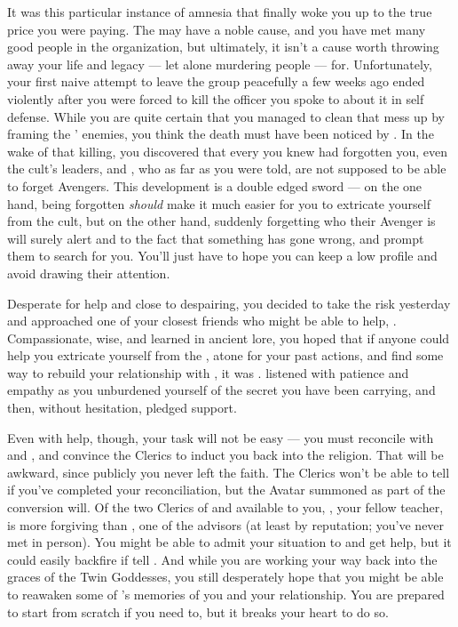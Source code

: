 \documentclass[char]{GL2020}
\begin{document}
It was this particular instance of amnesia that finally woke you up to the true price you were paying. The \pGoaties{} may have a noble cause, and you have met many good people in the organization, but ultimately, it isn't a cause worth throwing away your life and legacy — let alone murdering people — for. Unfortunately, your first naive attempt to leave the group peacefully a few weeks ago ended violently after you were forced to kill the officer you spoke to about it in self defense. While you are quite certain that you managed to clean that mess up by framing the \pGoaties{}’ enemies, you think the death must have been noticed by \cGenesis{} \cGenesis{\themself}. In the wake of that killing, you discovered that every \pGoatie{} you knew had forgotten you, even the cult’s leaders, \cChupSecond{\full} and \cChupLeader{\full}, who as far as you were told, are not supposed to be able to forget Avengers. This development is a double edged sword — on the one hand, being forgotten \emph{should} make it much easier for you to extricate yourself from the cult, but on the other hand, suddenly forgetting who their Avenger is will surely alert \cChupSecond{} and \cChupLeader{} to the fact that something has gone wrong, and prompt them to search for you. You’ll just have to hope you can keep a low profile and avoid drawing their attention.

Desperate for help and close to despairing, you decided to take the risk yesterday and approached one of your closest friends who might be able to help, \cLibrarian{\full}. Compassionate, wise, and learned in ancient lore, you hoped that if anyone could help you extricate yourself from the \pGoaties{}, atone for your past actions, and find some way to rebuild your relationship with \cHeadScientist{}, it was \cLibrarian{\them}. \cLibrarian{} listened with patience and empathy as you unburdened yourself of the secret you have been carrying, and then, without hesitation, pledged \cLibrarian{\their} support.

Even with help, though, your task will not be easy — you must reconcile with \cEbb{} and \cFlow{}, and convince the Clerics to induct you back into the religion. That will be awkward, since publicly you never left the faith. The Clerics won't be able to tell if you've completed your reconciliation, but the Avatar summoned as part of the conversion will. Of the two Clerics of \cEbb{} and \cFlow{} available to you, \cFlowPriest{\full}, your fellow teacher, is more forgiving than \cEbbPriest{\full}, one of the advisors (at least by reputation; you've never met \cEbbPriest{} in person). You might be able to admit your situation to \cFlowPriest{} and get \cFlowPriest{\their} help, but it could easily backfire if \cFlowPriest{\they} tell\cFlowPriest{\verbs} \cEbbPriest{}. And while you are working your way back into the graces of the Twin Goddesses, you still desperately hope that you might be able to reawaken some of \cHeadScientist{}’s memories of you and your relationship. You are prepared to start from scratch if you need to, but it breaks your heart to do so.
\end{document}
